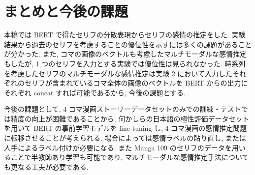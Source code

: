 \documentclass[twocolumn]{jarticle}     %
\begin{document}
\section{まとめと今後の課題}
本稿では BERT で得たセリフの分散表現からセリフの感情の推定をした. 実験結果から過去のセリフを考慮することの優位性を示すには多くの課題があることが分かった. また, コマの画像のベクトルも考慮したマルチモーダルな感情推定もしたが, 1 つのセリフを入力とする実験では優位性は見られなかった. 時系列を考慮したセリフのマルチモーダルな感情推定は実験 2 において入力したそれぞれのセリフが含まれているコマ全体の画像のベクトルを BERT からの出力にそれぞれ concat すれば可能であるから, 今後の課題とする.

今後の課題として, 4 コマ漫画ストーリーデータセットのみでの訓練・テストでは精度の向上が困難であることから, 何かしらの日本語の極性評価データセットを用いて BERT の事前学習モデルを fine tuning し, 4 コマ漫画の感情推定問題に転移させることが考えられる. 場合によっては感情ラベルの貼り直し, または人手によるラベル付けが必要になる. また Manga 109 のセリフのデータを用いることで半教師あり学習も可能であり, マルチモーダルな感情推定手法についても更なる工夫が必要である.


\begin{table}[!b]
\begin{center}
\caption{実験 1 結果(評価用データ)}
\label{table:result_1}
\end{center}
\end{table}
\end{document}
